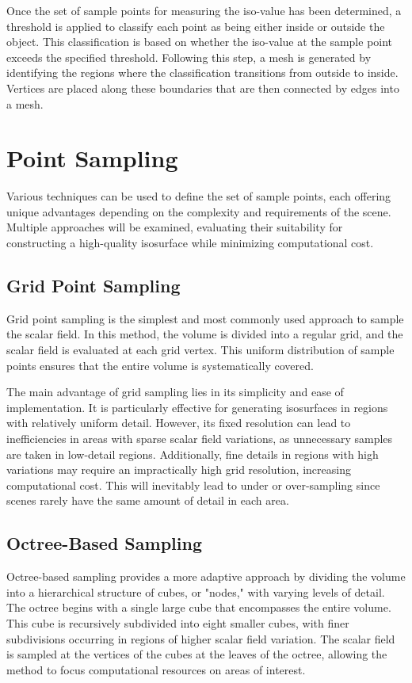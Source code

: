 Once the set of sample points for measuring the iso-value has been determined, a threshold is applied to classify each point as being either inside or outside the object. This classification is based on whether the iso-value at the sample point exceeds the specified threshold. Following this step, a mesh is generated by identifying the regions where the classification transitions from outside to inside. Vertices are placed along these boundaries that are then connected by edges into a mesh.

\section{Point Sampling}

Various techniques can be used to define the set of sample points, each offering unique advantages depending on the complexity and requirements of the scene. Multiple approaches will be examined, evaluating their suitability for constructing a high-quality isosurface while minimizing computational cost.

\subsection{Grid Point Sampling}

Grid point sampling is the simplest and most commonly used approach to sample the scalar field. In this method, the volume is divided into a regular grid, and the scalar field is evaluated at each grid vertex. This uniform distribution of sample points ensures that the entire volume is systematically covered.

The main advantage of grid sampling lies in its simplicity and ease of implementation. It is particularly effective for generating isosurfaces in regions with relatively uniform detail. However, its fixed resolution can lead to inefficiencies in areas with sparse scalar field variations, as unnecessary samples are taken in low-detail regions. Additionally, fine details in regions with high variations may require an impractically high grid resolution, increasing computational cost. This will inevitably lead to under or over-sampling since scenes rarely have the same amount of detail in each area.

\subsection{Octree-Based Sampling}

Octree-based sampling provides a more adaptive approach by dividing the volume into a hierarchical structure of cubes, or "nodes," with varying levels of detail. The octree begins with a single large cube that encompasses the entire volume. This cube is recursively subdivided into eight smaller cubes, with finer subdivisions occurring in regions of higher scalar field variation. The scalar field is sampled at the vertices of the cubes at the leaves of the octree, allowing the method to focus computational resources on areas of interest.

